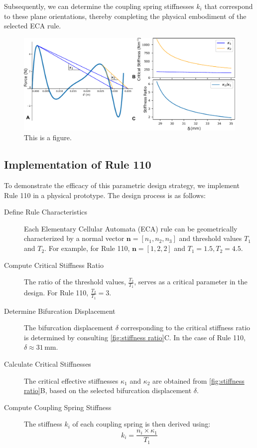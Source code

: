 Subsequently, we can determine the coupling spring stiffnesses \( k_i \) that correspond to these plane orientations, thereby completing the physical embodiment of the selected ECA rule.



\begin{figure}[H]
    \centering
    \includegraphics[width=\textwidth]{images/SVGs/stiffness_ratio.pdf}
    \caption{This is a figure.}
    \label{fig:stiffness ratio}
\end{figure}

\subsection*{Implementation of Rule 110}

To demonstrate the efficacy of this parametric design strategy, we implement Rule 110 in a physical prototype. The design process is as follows:

\begin{description}
    \item[Define Rule Characteristics] Each Elementary Cellular Automata (ECA) rule can be geometrically characterized by a normal vector \( \mathbf{n} = [n_1, n_2, n_3] \) and threshold values \( T_1 \) and \( T_2 \). For example, for Rule 110, \( \mathbf{n} = [1, 2, 2] \) and \( T_1 = 1.5, T_2 = 4.5 \).
    
    \item[Compute Critical Stiffness Ratio] The ratio of the threshold values, \( \frac{T_2}{T_1} \), serves as a critical parameter in the design. For Rule 110, \( \frac{T_2}{T_1} = 3 \).
    
    \item[Determine Bifurcation Displacement] The bifurcation displacement \( \delta \) corresponding to the critical stiffness ratio is determined by consulting \autoref*{fig:stiffness ratio}C. In the case of Rule 110, \( \delta \approx 31 \, \text{mm} \).
    
    \item[Calculate Critical Stiffnesses] The critical effective stiffnesses \( \kappa_1 \) and \( \kappa_2 \) are obtained from \autoref*{fig:stiffness ratio}B, based on the selected bifurcation displacement \( \delta \).
    
    \item[Compute Coupling Spring Stiffness] The stiffness \( k_i \) of each coupling spring is then derived using:
    \[
    k_i = \frac{n_i \times \kappa_1}{T_1}
    \]
\end{description}

